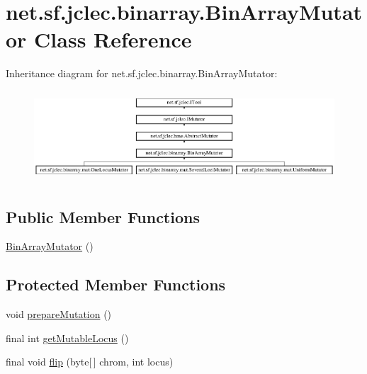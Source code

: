 \hypertarget{classnet_1_1sf_1_1jclec_1_1binarray_1_1_bin_array_mutator}{\section{net.\-sf.\-jclec.\-binarray.\-Bin\-Array\-Mutator Class Reference}
\label{classnet_1_1sf_1_1jclec_1_1binarray_1_1_bin_array_mutator}
}
Inheritance diagram for net.\-sf.\-jclec.\-binarray.\-Bin\-Array\-Mutator\-:\begin{figure}[H]
\begin{center}
\leavevmode
\includegraphics[height=3.431373cm]{classnet_1_1sf_1_1jclec_1_1binarray_1_1_bin_array_mutator}
\end{center}
\end{figure}
\subsection*{Public Member Functions}
\begin{DoxyCompactItemize}
\item 
\hyperlink{classnet_1_1sf_1_1jclec_1_1binarray_1_1_bin_array_mutator_afe2bc031aba996621cce38c7fbb78675}{Bin\-Array\-Mutator} ()
\end{DoxyCompactItemize}
\subsection*{Protected Member Functions}
\begin{DoxyCompactItemize}
\item 
void \hyperlink{classnet_1_1sf_1_1jclec_1_1binarray_1_1_bin_array_mutator_a104587c4458bc8c299cdf902e0ee0cc9}{prepare\-Mutation} ()
\item 
final int \hyperlink{classnet_1_1sf_1_1jclec_1_1binarray_1_1_bin_array_mutator_a6feab6c84b950942298a58b3c5d21fd5}{get\-Mutable\-Locus} ()
\item 
final void \hyperlink{classnet_1_1sf_1_1jclec_1_1binarray_1_1_bin_array_mutator_a6f162a319387eb82bfdb32ff8549ac2f}{flip} (byte\mbox{[}$\,$\mbox{]} chrom, int locus)
\end{DoxyCompactItemize}

